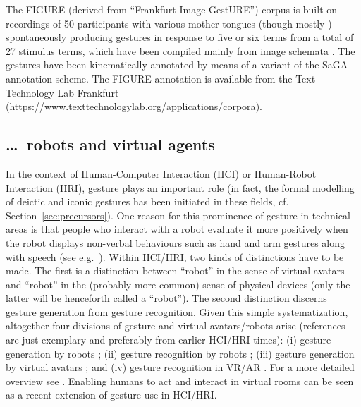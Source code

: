 \documentclass[output=paper
 	        ,biblatex
                ,babelshorthands
                ,newtxmath
                ,draftmode
                ,colorlinks, citecolor=brown
]{langscibook}
\begin{document}
The FIGURE (derived from \enquote{Frankfurt Image GestURE}) corpus \citep{Luecking:Mehler:Walther:Mauri:Kurfuerst:2016} is built on recordings of 50 participants with various mother tongues (though mostly ) spontaneously producing gestures in response to five or six terms from a total of 27 stimulus terms, which have been compiled mainly from image schemata \citep[]{Lakoff87a-u}.
%
The gestures have been kinematically annotated by means of a variant of the SaGA annotation scheme.
%
The FIGURE annotation is available from the Text Technology Lab Frankfurt (\url{https://www.texttechnologylab.org/applications/corpora}).



\subsection{\ldots\ robots and virtual agents}
\label{sec:virtual-agents}

In the context of Human-Computer Interaction (HCI) or Human-Robot Interaction (HRI), gesture plays an important role (in fact, the formal modelling of deictic and iconic gestures has been initiated in these fields, cf. Section~\ref{sec:precursors}).
%
One reason for this prominence of gesture in technical areas is that people who interact with a robot evaluate it more positively when the robot displays non-verbal behaviours such as hand and arm gestures along with speech (see e.g.\ \citealt{Salem:et:al:2012}).
%
Within HCI/HRI, two kinds of distinctions have to be made. 
%
The first is a distinction between \enquote{robot} in the sense of virtual avatars and \enquote{robot} in the (probably more common) sense of physical devices (only the latter will be henceforth called a \enquote{robot}).
%
The second distinction discerns gesture generation from gesture recognition.
%
Given this simple systematization, altogether four divisions of gesture and virtual avatars/robots arise (references are just exemplary and preferably from earlier HCI/HRI times):
%
(i) gesture generation by robots \citep[e.g.][]{Le:et:al:2011};
%
(ii) gesture recognition by robots \citep[e.g.][]{Triesch:vanDerMalsburg:1998};
%
(iii) gesture generation by virtual avatars \citep[e.g.][]{Cassell:Stone:Yan:2000};
%
and (iv) gesture recognition in VR/AR \citep[e.g.][]{Weissmann:Salomon:1999}.
%
For a more detailed overview see \citet{Luecking:Pfeiffer:2012}.
%
Enabling humans to act and interact in virtual rooms \citep[e.g.][]{Pfeiffer:et:al:2018} can be seen as a recent extension of gesture use in HCI/HRI.
\end{document}
